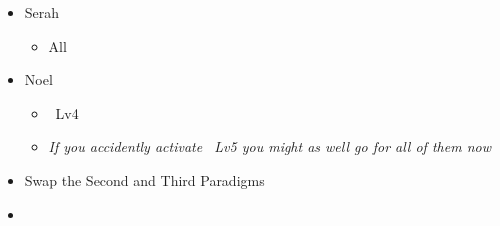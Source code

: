 \begin{menu}
	\begin{itemize}
		\crystarium
		\begin{itemize}
			\item Serah
			      \begin{itemize}
				      \item All \rav
			      \end{itemize}
			\item Noel
			      \begin{itemize}
				      \item \rav\ Lv4
				      \item \textit{If you accidently activate \rav\ Lv5 you might as well go for all of them now}
			      \end{itemize}
		\end{itemize}
		\paradigm
		\begin{itemize}
			\item Swap the Second and Third Paradigms
			\item {}%
			      {\paradigmline[1]{\textit{\com}}{\textit{\com}}{}{(\X)}}%
			      {\paradigmline{\textit{\com}}{(\com)}{}{(\X)}}%
			      {\paradigmline{\com}{\textit{\rav}}{}{(\W)}}%
			      {\paradigmline{\sen}{\sen}{}{(\W)}}%
			      {\paradigmline{\textit{[\rav]}}{\textit{\rav}}{}{(\W)}}%
			      {\paradigmline{\textit{[\rav]}}{\textit{\rav}}{}{(\W)}}
		\end{itemize}
	\end{itemize}
\end{menu}

\livet{\x}

\livet{\tri}


